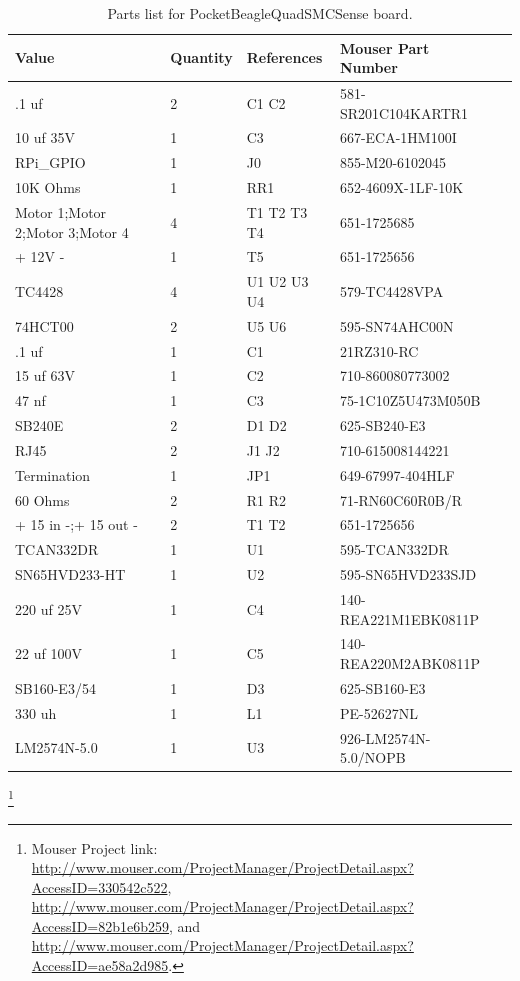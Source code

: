 \begin{table}[htdp]
\begin{centering}\begin{tabular}{|l|l|p{1in}|l|p{.5in}|}
\hline
Value&Quantity&References&Mouser Part Number \\
\hline
.1 uf&2&C1 C2&581-SR201C104KARTR1 \\
\hline
10 uf 35V&1&C3&667-ECA-1HM100I \\
\hline
RPi\_GPIO&1&J0&855-M20-6102045 \\
\hline
10K Ohms&1&RR1&652-4609X-1LF-10K \\
\hline
Motor 1;Motor 2;Motor 3;Motor 4&4&T1 T2 T3 T4&651-1725685 \\
\hline
+ 12V -&1&T5&651-1725656 \\
\hline
TC4428&4&U1 U2 U3 U4&579-TC4428VPA \\
\hline
74HCT00&2&U5 U6&595-SN74AHC00N \\
\hline
.1 uf&1&C1&21RZ310-RC\\
\hline
15 uf 63V&1&C2&710-860080773002\\
\hline
47 nf&1&C3&75-1C10Z5U473M050B\\
\hline
SB240E&2&D1 D2&625-SB240-E3\\
\hline
RJ45&2&J1 J2&710-615008144221\\
\hline
Termination&1&JP1&649-67997-404HLF\\
\hline
60 Ohms&2&R1 R2&71-RN60C60R0B/R\\
\hline
+ 15 in -;+ 15 out -&2&T1 T2&651-1725656\\
\hline
TCAN332DR&1&U1&595-TCAN332DR\\
\hline
SN65HVD233-HT&1&U2&595-SN65HVD233SJD\\
\hline
220 uf 25V&1&C4&140-REA221M1EBK0811P\\
\hline
22 uf 100V&1&C5&140-REA220M2ABK0811P\\
\hline
SB160-E3/54&1&D3&625-SB160-E3\\
\hline
330 uh&1&L1&PE-52627NL\\
\hline
LM2574N-5.0&1&U3&926-LM2574N-5.0/NOPB\\
\hline
\end{tabular}
\caption{Parts list for PocketBeagleQuadSMCSense board.}
\end{centering}\end{table}\footnote{Mouser Project link: 
\url{http://www.mouser.com/ProjectManager/ProjectDetail.aspx?AccessID=330542c522},
\url{http://www.mouser.com/ProjectManager/ProjectDetail.aspx?AccessID=82b1e6b259}, and
\url{http://www.mouser.com/ProjectManager/ProjectDetail.aspx?AccessID=ae58a2d985}.}


